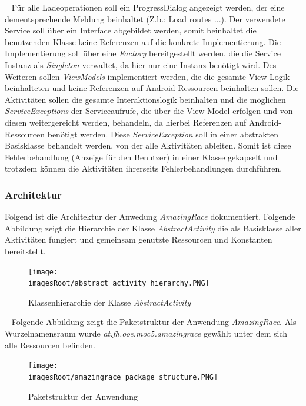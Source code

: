 \documentclass[11pt, a4paper, twoside]{article}   	%
\newcommand{\imagesRoot}{images}
\begin{document}
\ \newline
Für alle Ladeoperationen soll ein ProgressDialog angezeigt werden, der eine dementsprechende Meldung beinhaltet (Z.b.: Load routes ...). Der verwendete Service soll über ein Interface abgebildet werden, somit beinhaltet die benutzenden Klasse keine Referenzen auf die konkrete Implementierung. Die Implementierung soll über eine \emph{Factory} bereitgestellt werden, die die Service Instanz als \emph{Singleton} verwaltet, da hier nur eine Instanz benötigt wird. Des Weiteren sollen \emph{ViewModels} implementiert werden, die die gesamte View-Logik beinhalteten und keine Referenzen auf Android-Ressourcen beinhalten sollen.
\newline
\newline
Die Aktivitäten sollen die gesamte Interaktionslogik beinhalten und die möglichen \emph{ServiceExceptions} der Serviceaufrufe, die über die View-Model erfolgen und von diesen weitergereicht werden, behandeln, da hierbei Referenzen auf Android-Ressourcen benötigt werden. Diese \emph{ServiceException} soll in einer abstrakten Basisklasse behandelt werden, von der alle Aktivitäten ableiten. Somit ist diese Fehlerbehandlung (Anzeige für den Benutzer) in einer Klasse gekapselt und trotzdem können die Aktivitäten ihrerseits Fehlerbehandlungen durchführen.
\newpage

\subsubsection{Architektur}
Folgend ist die Architektur der Anwedung \emph{AmazingRace} dokumentiert.
\newline
\newline
Folgende Abbildung zeigt die Hierarchie der Klasse \emph{AbstractActivity} die als Basisklasse aller Aktivitäten fungiert und gemeinsam genutzte Ressourcen und Konstanten bereitstellt.
\begin{figure}[h]
	\centering
	\texttt{[image: \\imagesRoot/abstract\_activity\_hierarchy.PNG]}
	\caption
	{Klassenhierarchie der Klasse \emph{AbstractActivity}}
\end{figure}
\ \newline
Folgende Abbildung zeigt die Paketstruktur der Anwendung \emph{AmazingRace}. Als Wurzelnamensraum wurde \emph{at.fh.ooe.moc5.amazingrace} gewählt unter dem sich alle Ressourcen befinden.
\begin{figure}[h]
	\centering
	\texttt{[image: \\imagesRoot/amazingrace\_package\_structure.PNG]}
	\caption
	{Paketstruktur der Anwendung}
\end{figure}
\ \newline
\newpage
\end{document}
